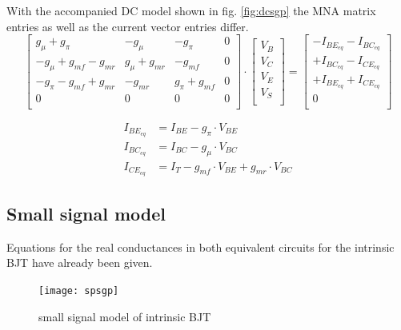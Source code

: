 \documentclass[10pt]{report}
\begin{document}
With the accompanied DC model shown in fig. \ref{fig:dcsgp} the MNA
matrix entries as well as the current vector entries differ.
\begin{equation}
\begin{bmatrix}
g_{\mu} + g_{\pi} & -g_{\mu} & -g_{\pi} & 0\\
-g_{\mu} + g_{mf} -g_{mr} & g_{\mu} +g_{mr} & -g_{mf} & 0\\
-g_{\pi} - g_{mf} +g_{mr} & -g_{mr} & g_{\pi} + g_{mf} & 0\\
0 & 0 & 0 & 0\\
\end{bmatrix}
\cdot
\begin{bmatrix}
V_{B}\\
V_{C}\\
V_{E}\\
V_{S}\\
\end{bmatrix}
=
\begin{bmatrix}
-I_{BE_{eq}} - I_{BC_{eq}}\\
+I_{BC_{eq}} - I_{CE_{eq}}\\
+I_{BE_{eq}} + I_{CE_{eq}}\\
0\\
\end{bmatrix}
\end{equation}

\begin{align}
I_{BE_{eq}} &= I_{BE} - g_{\pi} \cdot V_{BE}\\
I_{BC_{eq}} &= I_{BC} - g_{\mu} \cdot V_{BC}\\
I_{CE_{eq}} &= I_{T} - g_{mf} \cdot V_{BE} + g_{mr} \cdot V_{BC}
\end{align}


\subsection{Small signal model}

Equations for the real conductances in both equivalent circuits for
the intrinsic BJT have already been given.

\begin{figure}[ht]
\begin{center}
\texttt{[image: spsgp]}
\end{center}
\caption{small signal model of intrinsic BJT}
\label{fig:spsgp}
\end{figure}
\FloatBarrier
\end{document}
